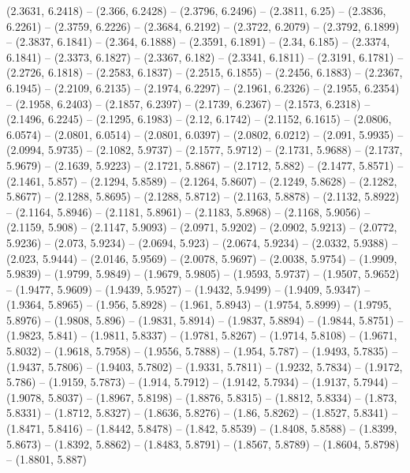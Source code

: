 {  (2.3631, 6.2418) -- (2.366, 6.2428) -- (2.3796, 6.2496) -- (2.3811, 6.25) -- 
  (2.3836, 6.2261) -- (2.3759, 6.2226) -- (2.3684, 6.2192) -- (2.3722, 6.2079) 
  -- (2.3792, 6.1899) -- (2.3837, 6.1841) -- (2.364, 6.1888) -- (2.3591, 6.1891)
   -- (2.34, 6.185) -- (2.3374, 6.1841) -- (2.3373, 6.1827) -- (2.3367, 6.182) 
  -- (2.3341, 6.1811) -- (2.3191, 6.1781) -- (2.2726, 6.1818) -- (2.2583, 
  6.1837) -- (2.2515, 6.1855) -- (2.2456, 6.1883) -- (2.2367, 6.1945) -- 
  (2.2109, 6.2135) -- (2.1974, 6.2297) -- (2.1961, 6.2326) -- (2.1955, 6.2354) 
  -- (2.1958, 6.2403) -- (2.1857, 6.2397) -- (2.1739, 6.2367) -- (2.1573, 
  6.2318) -- (2.1496, 6.2245) -- (2.1295, 6.1983) -- (2.12, 6.1742) -- (2.1152, 
  6.1615) -- (2.0806, 6.0574) -- (2.0801, 6.0514) -- (2.0801, 6.0397) -- 
  (2.0802, 6.0212) -- (2.091, 5.9935) -- (2.0994, 5.9735) -- (2.1082, 5.9737) --
   (2.1577, 5.9712) -- (2.1731, 5.9688) -- (2.1737, 5.9679) -- (2.1639, 5.9223) 
  -- (2.1721, 5.8867) -- (2.1712, 5.882) -- (2.1477, 5.8571) -- (2.1461, 5.857) 
  -- (2.1294, 5.8589) -- (2.1264, 5.8607) -- (2.1249, 5.8628) -- (2.1282, 
  5.8677) -- (2.1288, 5.8695) -- (2.1288, 5.8712) -- (2.1163, 5.8878) -- 
  (2.1132, 5.8922) -- (2.1164, 5.8946) -- (2.1181, 5.8961) -- (2.1183, 5.8968) 
  -- (2.1168, 5.9056) -- (2.1159, 5.908) -- (2.1147, 5.9093) -- (2.0971, 5.9202)
   -- (2.0902, 5.9213) -- (2.0772, 5.9236) -- (2.073, 5.9234) -- (2.0694, 5.923)
   -- (2.0674, 5.9234) -- (2.0332, 5.9388) -- (2.023, 5.9444) -- (2.0146, 
  5.9569) -- (2.0078, 5.9697) -- (2.0038, 5.9754) -- (1.9909, 5.9839) -- 
  (1.9799, 5.9849) -- (1.9679, 5.9805) -- (1.9593, 5.9737) -- (1.9507, 5.9652) 
  -- (1.9477, 5.9609) -- (1.9439, 5.9527) -- (1.9432, 5.9499) -- (1.9409, 
  5.9347) -- (1.9364, 5.8965) -- (1.956, 5.8928) -- (1.961, 5.8943) -- (1.9754, 
  5.8999) -- (1.9795, 5.8976) -- (1.9808, 5.896) -- (1.9831, 5.8914) -- (1.9837,
   5.8894) -- (1.9844, 5.8751) -- (1.9823, 5.841) -- (1.9811, 5.8337) -- 
  (1.9781, 5.8267) -- (1.9714, 5.8108) -- (1.9671, 5.8032) -- (1.9618, 5.7958) 
  -- (1.9556, 5.7888) -- (1.954, 5.787) -- (1.9493, 5.7835) -- (1.9437, 5.7806) 
  -- (1.9403, 5.7802) -- (1.9331, 5.7811) -- (1.9232, 5.7834) -- (1.9172, 5.786)
   -- (1.9159, 5.7873) -- (1.914, 5.7912) -- (1.9142, 5.7934) -- (1.9137, 
  5.7944) -- (1.9078, 5.8037) -- (1.8967, 5.8198) -- (1.8876, 5.8315) -- 
  (1.8812, 5.8334) -- (1.873, 5.8331) -- (1.8712, 5.8327) -- (1.8636, 5.8276) --
   (1.86, 5.8262) -- (1.8527, 5.8341) -- (1.8471, 5.8416) -- (1.8442, 5.8478) --
   (1.842, 5.8539) -- (1.8408, 5.8588) -- (1.8399, 5.8673) -- (1.8392, 5.8862) 
  -- (1.8483, 5.8791) -- (1.8567, 5.8789) -- (1.8604, 5.8798) -- (1.8801, 5.887)
}
